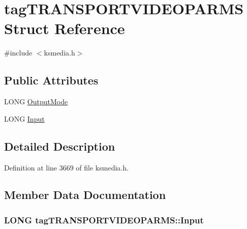 \hypertarget{structtag_t_r_a_n_s_p_o_r_t_v_i_d_e_o_p_a_r_m_s}{}\section{tag\+T\+R\+A\+N\+S\+P\+O\+R\+T\+V\+I\+D\+E\+O\+P\+A\+R\+MS Struct Reference}
\label{structtag_t_r_a_n_s_p_o_r_t_v_i_d_e_o_p_a_r_m_s}


{\ttfamily \#include $<$ksmedia.\+h$>$}

\subsection*{Public Attributes}
\begin{DoxyCompactItemize}
\item 
L\+O\+NG \hyperlink{structtag_t_r_a_n_s_p_o_r_t_v_i_d_e_o_p_a_r_m_s_a9f5f53da03d07d8dbf68200f1a18c21e}{Output\+Mode}
\item 
L\+O\+NG \hyperlink{structtag_t_r_a_n_s_p_o_r_t_v_i_d_e_o_p_a_r_m_s_a267f180040dc410ecb707997bd00f6f9}{Input}
\end{DoxyCompactItemize}


\subsection{Detailed Description}


Definition at line 3669 of file ksmedia.\+h.



\subsection{Member Data Documentation}
\subsubsection[{\texorpdfstring{Input}{Input}}]{\setlength{\rightskip}{0pt plus 5cm}L\+O\+NG tag\+T\+R\+A\+N\+S\+P\+O\+R\+T\+V\+I\+D\+E\+O\+P\+A\+R\+M\+S\+::\+Input}\hypertarget{structtag_t_r_a_n_s_p_o_r_t_v_i_d_e_o_p_a_r_m_s_a267f180040dc410ecb707997bd00f6f9}{}\label{structtag_t_r_a_n_s_p_o_r_t_v_i_d_e_o_p_a_r_m_s_a267f180040dc410ecb707997bd00f6f9}


